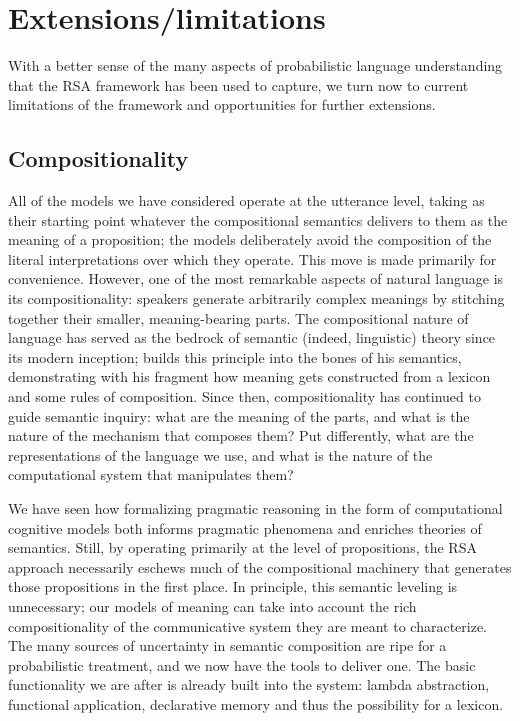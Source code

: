 \documentclass{sp}
\newcommand{\mht}[1]{\textcolor{purple}{[mht: #1]}}
\begin{document}
 





\section{Extensions/limitations} \label{limitations}

With a better sense of the many aspects of probabilistic language understanding that the RSA framework has been used to capture, we turn now to current limitations of the framework and opportunities for further extensions.

\subsection{Compositionality}

All of the models we have considered operate at the utterance level, taking as their starting point whatever the compositional semantics delivers to them as the meaning of a proposition; the models deliberately avoid the composition of the literal interpretations over which they operate. This move is made primarily for convenience. However, one of the most remarkable aspects of natural language is its compositionality: speakers generate arbitrarily complex meanings by stitching together their smaller, meaning-bearing parts. The compositional nature of language has served as the bedrock of semantic (indeed, linguistic) theory since its modern inception; \cite{montague1973} builds this principle into the bones of his semantics, demonstrating with his fragment how meaning gets constructed from a lexicon and some rules of composition. Since then, compositionality has continued to guide semantic inquiry: what are the meaning of the parts, and what is the nature of the mechanism that composes them? Put differently, what are the representations of the language we use, and what is the nature of the computational system that manipulates them? 

We have seen how formalizing pragmatic reasoning in the form of computational cognitive models both informs pragmatic phenomena and enriches theories of semantics. Still, by operating primarily at the level of propositions, the RSA approach necessarily eschews much of the compositional machinery that generates those propositions in the first place. In principle, this semantic leveling is unnecessary; our models of meaning can take into account the rich compositionality of the communicative system they are meant to characterize. The many sources of uncertainty in semantic composition are ripe for a probabilistic treatment, and we now have the tools to deliver one. The basic functionality we are after is already built into the system: lambda abstraction, functional application, declarative memory and thus the possibility for a lexicon.
\end{document}
